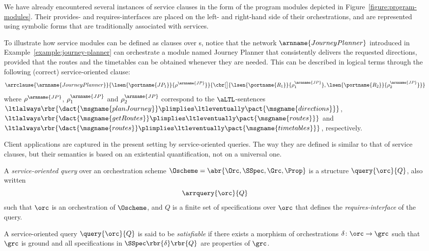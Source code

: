 \documentclass{LMCS}
\begin{document}
  \begin{exa}
    \label{example:journey-planner-module}
    We have already encountered several instances of service clauses in the form of the program modules depicted in Figure~\ref{figure:program-modules}.  Their provides- and requires-interfaces are placed on the left- and right-hand side of their orchestrations, and are represented using symbolic forms that are traditionally associated with services.

    To illustrate how service modules can be defined as clauses over s, notice that the network \(\arnname{JourneyPlanner}\) introduced in Example~\ref{example:journey-planner} can orchestrate a module named Journey Planner that consistently delivers the requested directions, provided that the routes and the timetables can be obtained whenever they are needed.
    This can be described in logical terms through the following (correct) service-oriented clause:
    \[
    \arrclause{
      \arnname{JourneyPlanner}
    }{
      \lsen{\portname{JP_{1}}}{\rho^{\arnname{JP}}}
    }{
      \cbr[\big]{\lsen{\portname{R_{1}}}{\rho^{\arnname{JP}}_{1}}, \lsen{\portname{R_{2}}}{\rho^{\arnname{JP}}_{2}}}
    }
    \]
    where \(\rho^{\arnname{JP}}\), \(\rho^{\arnname{JP}}_{1}\) and \(\rho^{\arnname{JP}}_{2}\) correspond to the \(\aLTL\)\nb-sentences
    \(\ltlalways \rbr{\dact{\msgname{planJourney}} \plimplies \ltleventually \pact{\msgname{directions}}}\),
    \(\ltlalways \rbr{\dact{\msgname{getRoutes}} \plimplies \ltleventually \pact{\msgname{routes}}}\) and
    \(\ltlalways \rbr{\dact{\msgname{routes}} \plimplies \ltleventually \pact{\msgname{timetables}}}\), respectively.
  \end{exa}

  Client applications are captured in the present setting by service-oriented queries.
  The way they are defined is similar to that of service clauses, but their semantics is based on an existential quantification, not on a universal one.

  \begin{defi}
    A \emph{service-oriented query} over an orchestration scheme \(\Oscheme = \abr{\Orc, \SSpec, \Grc, \Prop}\) is a structure \(\query{\orc}{Q}\), also written
    \[
    \arrquery{\orc}{Q}
    \]
    such that \(\orc\) is an orchestration of \(\Oscheme\), and \(Q\) is a finite set of specifications over \(\orc\) that defines the \emph{requires-interface} of the query.
  \end{defi}

  \begin{defi}
    A service-oriented query \(\query{\orc}{Q}\) is said to be \emph{satisfiable} if there exists a morphism of orchestrations \(\delta \colon \orc \to \grc\) such that \(\grc\) is ground and all specifications in \(\SSpec\rbr{\delta}\rbr{Q}\) are properties of \(\grc\).
  \end{defi}
\end{document}
